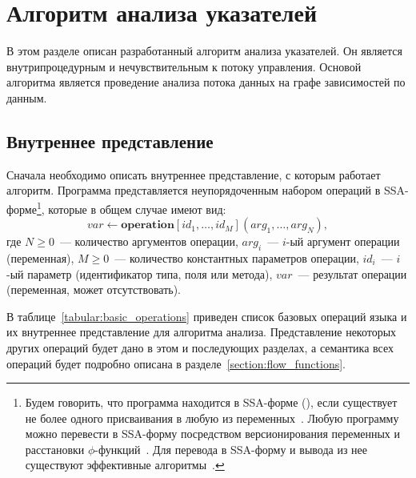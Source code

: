 \documentclass[14pt,titlepage,draft]{extarticle}
\newcommand{\java}{\eng{Java}\xspace}
\let\mathphi\phi
\renewcommand{\phi}{\ensuremath{\mathphi}}
\newcommand{\op}[1]{\mathbf{#1}}
\begin{document}
  \section{Алгоритм анализа указателей}

    В этом разделе описан разработанный алгоритм анализа указателей. Он является
    внутрипроцедурным и нечувствительным к потоку управления. Основой алгоритма
    является проведение анализа потока данных на графе зависимостей по данным.

  \subsection{Внутреннее представление}
    \label{section:ir_ops}

    Сначала необходимо описать внутреннее представление, с которым работает
    алгоритм. Программа представляется неупорядоченным набором операций в
    SSA-форме\footnote{
      Будем говорить, что программа находится в SSA-форме (), если существует не более одного присваивания в любую из
      переменных~\cite{ssa}.
      Любую программу можно перевести в SSA-форму посредством
      версионирования переменных и расстановки \phi-функций~\cite{ssa}.
      Для перевода в SSA-форму и вывода из нее существуют эффективные
      алгоритмы~\cite{bilardi_ssa, briggs_ssa}.
    }, которые в общем случае имеют вид:
    \[ var \gets \op{operation}[id_1, \ldots, id_M](arg_1, \ldots, arg_N), \]
    где
    $N \geq 0$~--- количество аргументов операции,
    $arg_i$~--- $i$-ый аргумент операции (переменная),
    $M \geq 0$~--- количество константных параметров операции,
    $id_i$~--- $i$-ый параметр (идентификатор типа, поля или метода),
    $var$~--- результат операции (переменная, может отсутствовать).

    В таблице~\ref{tabular:basic_operations} приведен список базовых операций
    языка \java и их внутреннее представление для алгоритма анализа.
    Представление некоторых других операций будет дано в этом и последующих
    разделах, а семантика всех операций будет подробно описана в
    разделе~\ref{section:flow_functions}.
\end{document}
